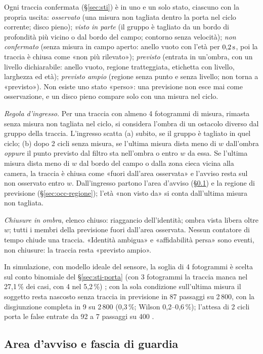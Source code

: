 Ogni traccia confermata (\S\ref{sec:sti}) è in uno e un solo stato, ciascuno con la propria uscita: \emph{osservato} (una misura non tagliata dentro la porta nel ciclo corrente; disco pieno); \emph{visto in parte} (il gruppo è tagliato da un bordo di profondità più vicino o dal bordo del campo; contorno senza velocità); \emph{non confermato} (senza misura in campo aperto: anello vuoto con l'età per $0{,}2\,\mathrm{s}$, poi la traccia è chiusa come «non più rilevato»); \emph{previsto} (entrata in un'ombra, con un livello dichiarabile: anello vuoto, regione tratteggiata, etichetta con livello, larghezza ed età); \emph{previsto ampio} (regione senza punto e senza livello; non torna a «previsto»). Non esiste uno stato «perso»: una previsione non esce mai come osservazione, e un disco pieno compare solo con una misura nel ciclo.

\emph{Regola d'ingresso.} Per una traccia con almeno 4 fotogrammi di misura, rimasta senza misura non tagliata nel ciclo, si considera l'ombra di un ostacolo diverso dal gruppo della traccia. L'ingresso scatta (a) subito, se il gruppo è tagliato in quel ciclo; (b) dopo 2 cicli senza misura, se l'ultima misura dista meno di $w$ dall'ombra \emph{oppure} il punto previsto dal filtro sta nell'ombra o entro $w$ da essa. Se l'ultima misura dista meno di $w$ dal bordo del campo o dalla zona cieca vicina alla camera, la traccia è chiusa come «fuori dall'area osservata» e l'avviso resta sul non osservato entro $w$. Dall'ingresso partono l'area d'avviso (\S\ref{sec:occ-avviso}) e la regione di previsione (\S\ref{sec:occ-regione}); l'età «non visto da» si conta dall'ultima misura non tagliata.

\emph{Chiusure in ombra}, elenco chiuso: riaggancio dell'identità; ombra vista libera oltre $w$; tutti i membri della previsione fuori dall'area osservata. Nessun contatore di tempo chiude una traccia. «Identità ambigua» e «affidabilità persa» sono eventi, non chiusure: la traccia resta «previsto ampio».

In simulazione, con modello ideale del sensore, la soglia di 4 fotogrammi è scelta sul conto binomiale del \S\ref{sec:sti-porta} (con 3 fotogrammi la traccia manca nel 27,1\,\% dei casi, con 4 nel 5,2\,\%) ; con la sola condizione sull'ultima misura il soggetto resta nascosto senza traccia in previsione in 87 passaggi su 2\,800, con la disgiunzione completa in 9 su 2\,800 (0,3\,\%; Wilson 0,2--0,6\,\%); l'attesa di 2 cicli porta le false entrate da 92 a 7 passaggi su 400 .

\subsection{Area d'avviso e fascia di guardia}\label{sec:occ-avviso}

